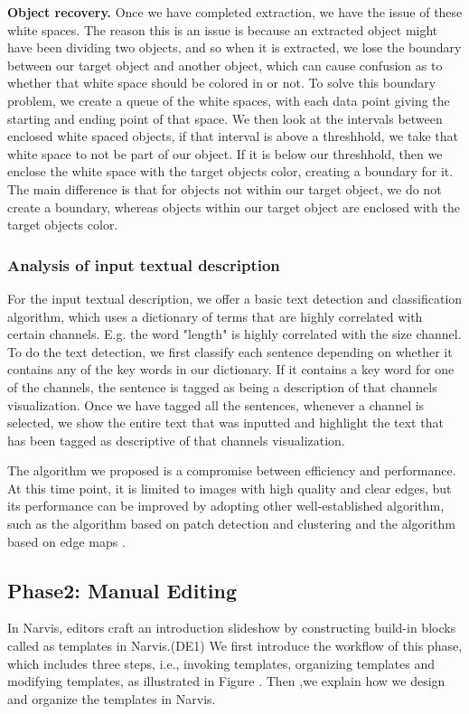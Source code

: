 \textbf{Object recovery.} Once we have completed extraction, we have the issue of these white spaces. The reason this is an issue is because an extracted object might have been dividing two objects, and so when it is extracted, we lose the boundary between our target object and another object, which can cause confusion as to whether that white space should be colored in or not. To solve this boundary problem, we create a queue of the white spaces, with each data point giving the starting and ending point of that space. We then look at the intervals between enclosed white spaced objects, if that interval is above a threshhold, we take that white space to not be part of our object. If it is below our threshhold, then we enclose the white space with the target objects color, creating a boundary for it. The main difference is that for objects not within our target object, we do not create a boundary, whereas objects within our target object are enclosed with the target objects color.

\subsubsection{Analysis of input textual description}
For the input textual description, we offer a basic text detection and classification algorithm, which uses a dictionary of terms that are highly correlated with certain channels. E.g. the word "length" is highly correlated with the size channel. To do the text detection, we first classify each sentence depending on whether it contains any of the key words in our dictionary. If it contains a key word for one of the channels, the sentence is tagged as being a description of that channels visualization. Once we have tagged all the sentences, whenever a channel is selected, we show the entire text that was inputted and highlight the text that has been tagged as descriptive of that channels visualization.

The algorithm we proposed is a compromise between efficiency and performance. At this time point, it is limited to images with high quality and clear edges, but its performance can be improved by adopting other well-established algorithm, such as the algorithm based on patch detection and clustering \cite{savva_revision:_2011} and the algorithm based on edge maps \cite{huang2003model}.

\subsection{Phase2: Manual Editing}
In Narvis, editors craft an introduction slideshow by constructing build-in blocks called as templates in Narvis.(DE1) We first introduce the workflow of this phase, which includes three steps, i.e., invoking templates, organizing templates and modifying templates, as illustrated in Figure . Then ,we explain how we design and organize the templates in Narvis. 

